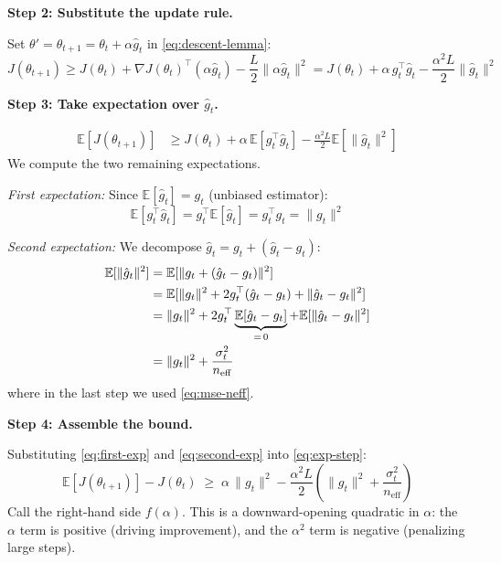 \documentclass[11pt,a4paper]{article}
\newcommand{\E}{\mathbb{E}}
\newcommand{\neff}{n_{\mathrm{eff}}}
\newcommand{\ghat}{\hat{g}_t}
\newcommand{\gtrue}{g_t}
\begin{document}
\textbf{Step 2: Substitute the update rule.}

Set $\theta' = \theta_{t+1} = \theta_t + \alpha\ghat$ in \eqref{eq:descent-lemma}:
\begin{equation}
  J(\theta_{t+1})
  \geq J(\theta_t) + \nabla J(\theta_t)^\top(\alpha\ghat) - \frac{L}{2}\|\alpha\ghat\|^2
  = J(\theta_t) + \alpha\,\gtrue^\top\ghat - \frac{\alpha^2 L}{2}\|\ghat\|^2
  \label{eq:before-expectation}
\end{equation}

\textbf{Step 3: Take expectation over $\ghat$.}

\begin{align}
  \E[J(\theta_{t+1})]
  &\geq J(\theta_t) + \alpha\,\E[\gtrue^\top\ghat] - \frac{\alpha^2 L}{2}\E[\|\ghat\|^2]
  \label{eq:exp-step}
\end{align}
We compute the two remaining expectations.

\emph{First expectation:} Since $\E[\ghat] = \gtrue$ (unbiased estimator):
\begin{equation}
  \E[\gtrue^\top\ghat] = \gtrue^\top\E[\ghat] = \gtrue^\top\gtrue = \|\gtrue\|^2
  \label{eq:first-exp}
\end{equation}

\emph{Second expectation:}
We decompose $\ghat = \gtrue + (\ghat - \gtrue)$:
\begin{align}
  \E[\|\ghat\|^2]
  &= \E[\|\gtrue + (\ghat - \gtrue)\|^2] \notag\\
  &= \E[\|\gtrue\|^2 + 2\gtrue^\top(\ghat-\gtrue) + \|\ghat-\gtrue\|^2] \notag\\
  &= \|\gtrue\|^2 + 2\gtrue^\top\underbrace{\E[\ghat-\gtrue]}_{=\,0} + \E[\|\ghat-\gtrue\|^2] \notag\\
  &= \|\gtrue\|^2 + \frac{\sigma_t^2}{\neff}
  \label{eq:second-exp}
\end{align}
where in the last step we used \eqref{eq:mse-neff}.

\textbf{Step 4: Assemble the bound.}

Substituting \eqref{eq:first-exp} and \eqref{eq:second-exp} into \eqref{eq:exp-step}:
\begin{equation}
  \boxed{
  \E[J(\theta_{t+1})] - J(\theta_t)
  \;\geq\;
  \alpha\,\|\gtrue\|^2 - \frac{\alpha^2 L}{2}\!\left(\|\gtrue\|^2 + \frac{\sigma_t^2}{\neff}\right)
  }
  \label{eq:improvement-bound}
\end{equation}
Call the right-hand side $f(\alpha)$.
This is a downward-opening quadratic in $\alpha$:
the $\alpha$ term is positive (driving improvement), and the $\alpha^2$ term is negative (penalizing large steps).
\end{document}
